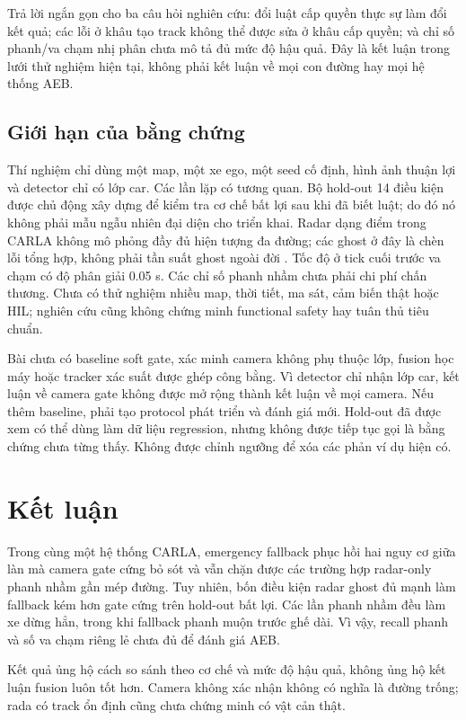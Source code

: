\documentclass[conference]{IEEEtran}
\begin{document}
Trả lời ngắn gọn cho ba câu hỏi nghiên cứu: đổi luật cấp quyền thực sự làm
đổi kết quả; các lỗi ở khâu tạo track không thể được sửa ở khâu cấp quyền;
và chỉ số phanh/va chạm nhị phân chưa mô tả đủ mức độ hậu quả. Đây là kết
luận trong lưới thử nghiệm hiện tại, không phải kết luận về mọi con đường
hay mọi hệ thống AEB.

\subsection{Giới hạn của bằng chứng}
Thí nghiệm chỉ dùng một map, một xe ego, một seed cố định, hình ảnh thuận lợi
và detector chỉ có lớp car. Các lần lặp có tương quan. Bộ hold-out 14 điều
kiện được chủ động xây dựng để kiểm tra cơ chế bất lợi sau khi đã biết luật;
do đó nó không phải mẫu ngẫu nhiên đại diện cho triển khai. Radar dạng điểm
trong CARLA không mô phỏng đầy đủ hiện tượng đa đường; các ghost ở đây là
chèn lỗi tổng hợp, không phải tần suất ghost ngoài đời
\cite{kraus2021ghost,magosi2022radar}. Tốc độ ở tick cuối trước va chạm có
độ phân giải 0.05 s. Các chỉ số phanh nhầm chưa phải chi phí chấn thương.
Chưa có thử nghiệm nhiều map, thời tiết, ma sát, cảm biến thật hoặc HIL;
nghiên cứu cũng không chứng minh functional safety hay tuân thủ tiêu chuẩn.

Bài chưa có baseline soft gate, xác minh camera không phụ thuộc lớp, fusion
học máy hoặc tracker xác suất được ghép công bằng. Vì detector chỉ nhận lớp
car, kết luận về camera gate không được mở rộng thành kết luận về mọi camera.
Nếu thêm baseline, phải tạo protocol phát triển và đánh giá mới. Hold-out đã
được xem có thể dùng làm dữ liệu regression, nhưng không được tiếp tục gọi là
bằng chứng chưa từng thấy. Không được chỉnh ngưỡng để xóa các phản ví dụ hiện
có.

\section{Kết luận}
Trong cùng một hệ thống CARLA, emergency fallback phục hồi hai nguy cơ giữa
làn mà camera gate cứng bỏ sót và vẫn chặn được các trường hợp radar-only
phanh nhầm gần mép đường. Tuy nhiên, bốn điều kiện radar ghost đủ mạnh làm
fallback kém hơn gate cứng trên hold-out bất lợi. Các lần phanh nhầm đều làm
xe dừng hẳn, trong khi fallback phanh muộn trước ghế dài. Vì vậy, recall
phanh và số va chạm riêng lẻ chưa đủ để đánh giá AEB.

Kết quả ủng hộ cách so sánh theo cơ chế và mức độ hậu quả, không ủng hộ kết
luận fusion luôn tốt hơn. Camera không xác nhận không có nghĩa là đường trống;
rada có track ổn định cũng chưa chứng minh có vật cản thật.

\balance


\end{document}
